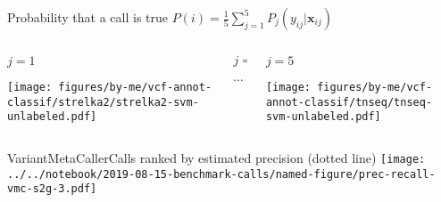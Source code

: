 \documentclass{beamer}
\begin{document}
\begin{frame}
\small
\begin{center}
Probability that a call is true
\(
P(i) = \frac{1}{5} \sum_{j=1}^5 P_j(y_{ij} | \mathbf{x}_{ij})
\)
\end{center}
\begin{columns}[t]
\begin{column}{0.33\textwidth}
\begin{center}
\(j=1\)
\end{center}

\texttt{[image: figures/by-me/vcf-annot-classif/strelka2/strelka2-svm-unlabeled.pdf]}
\end{column}

\begin{column}{0.33\textwidth}
\begin{center}
\(j=...\)

\vspace{0.7in}
\large
\(\cdots\)
\normalsize
\end{center}
\end{column}

\begin{column}{0.33\textwidth}
\begin{center}
\(j=5\)
\end{center}

\texttt{[image: figures/by-me/vcf-annot-classif/tnseq/tnseq-svm-unlabeled.pdf]}
\end{column}
\end{columns}
\end{frame}


\begin{frame}{VariantMetaCaller}{Calls ranked by estimated precision (dotted
line)}
\texttt{[image: ../../notebook/2019-08-15-benchmark-calls/named-figure/prec-recall-vmc-s2g-3.pdf]}
\end{frame}

\end{document}
